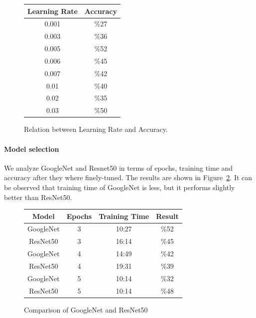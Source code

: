 \documentclass[twocolumn]{article}
\begin{document}
\begin{figure}

\begin{center}
 \begin{tabular}{|c|c|}
 \hline
 Learning Rate&Accuracy\\
 \hline
  \hline 0.001 & \%27 \\
 \hline 0.003 & \%36 \\

 \hline 0.005 & \%52 \\

  \hline 0.006 & \%45 \\
 \hline 0.007 & \%42 \\
  \hline 0.01 & \%40 \\
  \hline 0.02 & \%35 \\

  \hline
 0.03 & \%50 \\

 \hline
 
\end{tabular}
\caption{Relation between Learning Rate and Accuracy.}
\label{learning_rate}
\end{center}
\end{figure}

\paragraph{Model selection}
We analyze GoogleNet and Resnet50 in terms of epochs, training time and accuracy after they where finely-tuned. The results are shown in Figure~\ref{model}. It can be observed that training time of GoogleNet is less, but it performs slightly better than ResNet50. 

\begin{figure}
\begin{center}
 \begin{tabular}{|c|c|c|c|}
 \hline
 Model&Epochs&Training Time&Result\\
 \hline
   GoogleNet&3&10:27&\%52\\
 \hline
 ResNet50&3&16:14&\%45\\
 \hline
   GoogleNet&4&14:49&\%42\\
 \hline
 ResNet50&4&19:31&\%39\\
 \hline  GoogleNet&5&10:14&\%32\\
 \hline
 ResNet50&5&10:14&\%48\\
 \hline
 \hline
 
\end{tabular}
\caption{Comparison of GoogleNet and ResNet50}
\label{model}
\end{center}
\end{figure}
\end{document}
